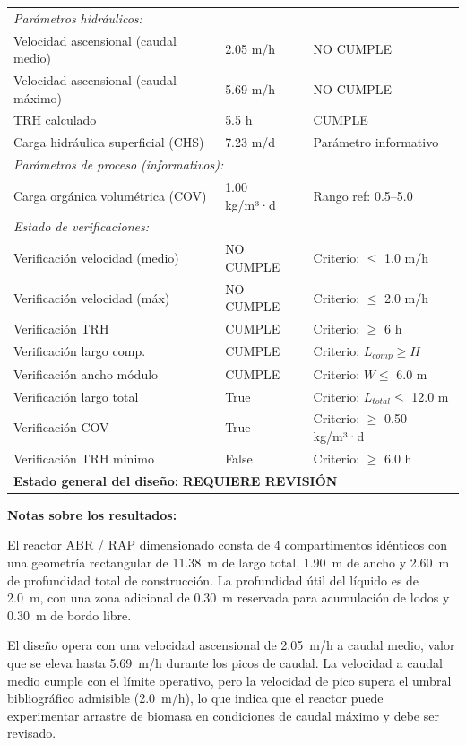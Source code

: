 \documentclass[12pt,a4paper]{article}
\begin{document}
\begin{longtable}{p{6cm}p{3cm}p{5cm}}
\multicolumn{3}{l}{\textit{Parámetros hidráulicos:}} \\
Velocidad ascensional (caudal medio) & 2.05 m/h & NO CUMPLE \\
Velocidad ascensional (caudal máximo) & 5.69 m/h & NO CUMPLE \\
TRH calculado & 5.5 h & CUMPLE \\
Carga hidráulica superficial (CHS) & 7.23 m/d & Parámetro informativo \\
\midrule

\multicolumn{3}{l}{\textit{Parámetros de proceso (informativos):}} \\
Carga orgánica volumétrica (COV) & 1.00 kg/m³·d & Rango ref: 0.5--5.0 \\
\midrule

\multicolumn{3}{l}{\textit{Estado de verificaciones:}} \\
Verificación velocidad (medio) & NO CUMPLE & Criterio: $\leq$ 1.0 m/h \\
Verificación velocidad (máx) & NO CUMPLE & Criterio: $\leq$ 2.0 m/h \\
Verificación TRH & CUMPLE & Criterio: $\geq$ 6 h \\
Verificación largo comp. & CUMPLE & Criterio: $L_{comp} \geq H$ \\
Verificación ancho módulo & CUMPLE & Criterio: $W \leq$ 6.0 m \\
Verificación largo total & True & Criterio: $L_{total} \leq$ 12.0 m \\
Verificación COV & True & Criterio: $\geq$ 0.50 kg/m³·d \\
Verificación TRH mínimo & False & Criterio: $\geq$ 6.0 h \\
\bottomrule
\multicolumn{3}{l}{\textbf{Estado general del diseño:} \textbf{REQUIERE REVISIÓN}} \\
\end{longtable}

\textbf{Notas sobre los resultados:}

El reactor ABR / RAP dimensionado consta de 4 compartimentos idénticos con una geometría rectangular de 11.38~m de largo total, 1.90~m de ancho y 2.60~m de profundidad total de construcción. La profundidad útil del líquido es de 2.0~m, con una zona adicional de 0.30~m reservada para acumulación de lodos y 0.30~m de bordo libre.

El diseño opera con una velocidad ascensional de 2.05~m/h a caudal medio, valor que se eleva hasta 5.69~m/h durante los picos de caudal. La velocidad a caudal medio cumple con el límite operativo, pero la velocidad de pico supera el umbral bibliográfico admisible (2.0~m/h), lo que indica que el reactor puede experimentar arrastre de biomasa en condiciones de caudal máximo y debe ser revisado.
\end{document}
